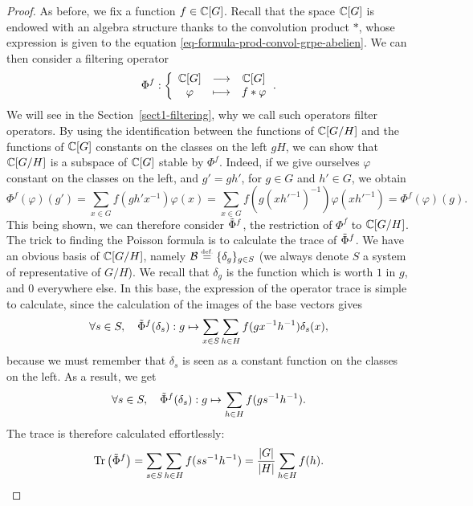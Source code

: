  
\begin{proof}
As before, we fix a function $ f \in \mathbb{C} [G] $. Recall that the space $ \mathbb{C} [G] $ is endowed with an algebra structure thanks to the convolution product $ * $, whose expression is given to the equation \eqref{eq-formula-prod-convol-grpe-abelien}. We can then consider a filtering operator
\begin{equation*}
\Phi^f: {\left\{ \begin{array}{ccc} \mathbb{C} [G] & \longrightarrow & \mathbb{C} [G] \\ \varphi & \longmapsto & f * \varphi \end{array} \right.}.
\end{equation*}
We will see in the Section~\ref{sect1-filtering}, why we call such operators filter operators. By using the identification between the functions of $ \mathbb{C} [G / H] $ and the functions of $ \mathbb{C} [G] $ constants on the classes on the left $ g H $, we can show that $ \mathbb{C} [G / H] $ is a subspace of $ \mathbb{C} [G] $ stable by $ \Phi^f $. Indeed, if we give ourselves $ \varphi $ constant on the classes on the left, and $ g'= g h' $, for $ g \in G $ and $ h'\in G $, we obtain
\begin{equation*}
\Phi^f(\varphi) (g') = \sum_{x \in G}{f(gh' x^{-1}) \varphi (x)} = \sum_{x \in G}{f(g (xh'^{-1})^{-1}) \varphi (x h'^{-1})} = \Phi^f(\varphi) (g).
\end{equation*}
This being shown, we can therefore consider $ \tilde{\Phi}^f $, the restriction of $ \Phi^f $ to $ \mathbb{C} [G / H] $. The trick to finding the Poisson formula is to calculate the trace of $ \tilde{\Phi}^f $. We have an obvious basis of $ \mathbb{C} [G / H] $, namely $ \mathcal{B} \stackrel{\mbox{\upshape\tiny def.}}{=} \{\delta_g\}_{g \in S} $ (we always denote $ S $ a system of representative of $ G / H $). We recall that $ \delta_g $ is the function which is worth $ 1 $ in $ g $, and $ 0 $ everywhere else. In this base, the expression of the operator trace is simple to calculate, since the calculation of the images of the base vectors gives
\begin{equation*}
\forall s \in S, \quad \tilde{\Phi}^f(\delta_s): g \mapsto \sum_{x \in S}{\sum_{h \in H}{f(gx^{- 1 } h^{-1}) \delta_s (x)}},
\end{equation*}
because we must remember that $ \delta_s $ is seen as a constant function on the classes on the left. As a result, we get
\begin{equation*}
\forall s \in S, \quad \tilde{\Phi}^f(\delta_s): g \mapsto \sum_{h \in H}{f(gs^{-1} h^{-1})} .
\end{equation*}
The trace is therefore calculated effortlessly:
\begin{equation*}
\Tr \left(\wt{\Phi}^f \right) = \sum_{s \in S}{\sum_{h \in H}{f(ss^{-1} h^{-1}) }} = \frac{|G|}{| H |} \sum_{h \in H}{f(h)}.

\end{equation*}
\end{proof}
